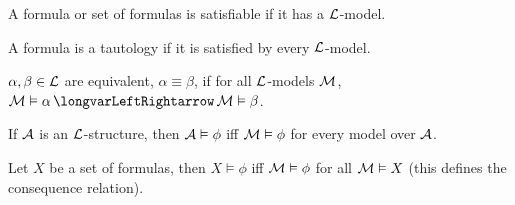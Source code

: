 \bdefn

    \benum
        \item A formula or set of formulas is {\emphcolor satisfiable} if it has a ${\cal L}$-model.
        \item A formula is a {\emphcolor tautology} if it is satisfied by every ${\cal L}$-model.
        \item $\alpha,\beta\in{\cal L}$ are {\emphcolor equivalent}, $\alpha\equiv\beta$, if for all
        ${\cal L}$-models ${\cal M}$, $\c M\vDash\alpha\iff\c M\vDash\beta$.
        \item If ${\cal A}$ is an ${\cal L}$-structure, then ${\cal A}\vDash\phi$ iff ${\cal M}\vDash\phi$ for
                every model over ${\cal A}$.
        \item Let $X$ be a set of formulas, then $X\vDash\phi$ iff ${\cal M}\vDash\phi$ for all
                ${\cal M}\vDash X$ (this defines the consequence relation).
    \eenum

\edefn


